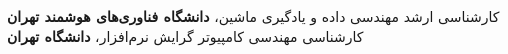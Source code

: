 \begin{scholarship}
      {کارشناسی ارشد مهندسی داده و یادگیری ماشین، \textbf{دانشگاه فناوری‌های هوشمند تهران}}
    {کارشناسی مهندسی کامپیوتر گرایش نرم‌افزار، \textbf{دانشگاه تهران}}
\end{scholarship}
